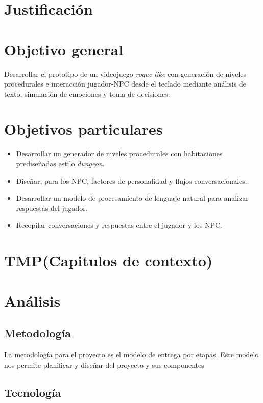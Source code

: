 \documentclass[12pt,twoside]{article}
\begin{document}
	\clearpage
	\section{Justificación}
	
	
	
	\clearpage
	\section{Objetivo general}
	Desarrollar el prototipo de un videojuego \textit{rogue like} con generación de niveles procedurales e interacción jugador-NPC desde el teclado mediante análisis de texto, simulación de emociones y toma de decisiones.
	
	\section{Objetivos particulares}
	
	\begin{itemize}
		\item Desarrollar un generador de niveles procedurales con habitaciones prediseñadas estilo \textit{dungeon}.
		\item Diseñar, para los NPC, factores de personalidad y flujos conversacionales.
		\item Desarrollar  un modelo  de procesamiento de lenguaje natural para analizar respuestas del jugador.
		\item Recopilar conversaciones y respuestas entre el jugador y los NPC.
	\end{itemize}
	
	\clearpage
	\section{TMP(Capitulos de contexto)}
	
	\clearpage
	\section{Análisis}
	
	\subsection{Metodología}

	La metodología para el proyecto es el modelo de entrega por etapas. Este modelo nos permite planificar y diseñar del proyecto y sus componentes 

	\subsection{Tecnología}	%
\end{document}

